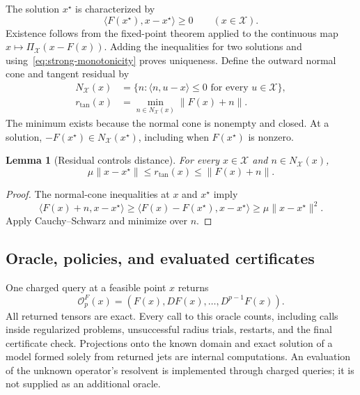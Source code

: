 \documentclass[11pt]{article}
\numberwithin{equation}{section}
\newtheorem{lemma}[theorem]{Lemma}
\theoremstyle{definition}
\theoremstyle{remark}
\begin{document}
The solution $x^\star$ is characterized by
\begin{equation}\label{eq:vi-solution}
\langle F(x^\star),x-x^\star\rangle\ge0
\qquad(x\in\mathcal X).
\end{equation}
Existence follows from the fixed-point theorem applied to the continuous
map $x\mapsto\Pi_{\mathcal X}(x-F(x))$. Adding the inequalities for two
solutions and using~\eqref{eq:strong-monotonicity} proves uniqueness. Define the outward
normal cone and tangent residual by
\begin{align}
N_{\mathcal X}(x)
&=\{n:\langle n,u-x\rangle\le0\text{ for every }u\in\mathcal X\},
\label{eq:normal-cone}\\
r_{\mathrm{tan}}(x)
&=\min_{n\in N_{\mathcal X}(x)}\|F(x)+n\|.
\label{eq:tangent-residual}
\end{align}
The minimum exists because the normal cone is nonempty and closed.
At a solution, $-F(x^\star)\in N_{\mathcal X}(x^\star)$, including when
$F(x^\star)$ is nonzero.

\begin{lemma}[Residual controls distance]\label{lem:error-bound}
For every $x\in\mathcal X$ and $n\in N_{\mathcal X}(x)$,
\begin{equation}\label{eq:error-distance}
\mu\|x-x^\star\|\le r_{\mathrm{tan}}(x)\le\|F(x)+n\|.
\end{equation}
\end{lemma}
\begin{proof}
The normal-cone inequalities at $x$ and $x^\star$ imply
\[
\langle F(x)+n,x-x^\star\rangle
\ge\langle F(x)-F(x^\star),x-x^\star\rangle
\ge\mu\|x-x^\star\|^2.
\]
Apply Cauchy--Schwarz and minimize over $n$.
\end{proof}

\subsection{Oracle, policies, and evaluated certificates}
One charged query at a feasible point $x$ returns
\begin{equation}\label{eq:full-jet}
\mathcal O_p^F(x)=(F(x),DF(x),\ldots,D^{p-1}F(x)).
\end{equation}
All returned tensors are exact. Every call to this oracle counts,
including calls inside regularized problems, unsuccessful radius trials,
restarts, and the final certificate check. Projections onto the known
domain and exact solution of a model formed solely from returned jets
are internal computations. An evaluation of the unknown operator's
resolvent is implemented through charged queries; it is not supplied as
an additional oracle.
\end{document}
